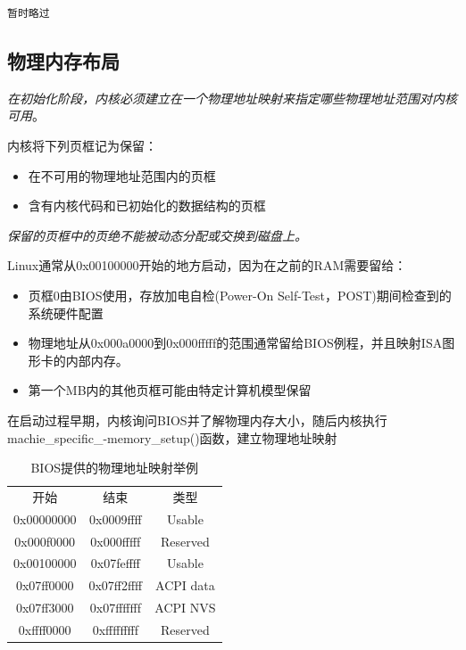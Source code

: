 \begin{lstlisting}[language=C++, caption={对页表项操作的宏}]
暂时略过
\end{lstlisting}

\subsection{物理内存布局}

    \emph{在初始化阶段，内核必须建立在一个物理地址映射来指定哪些物理地址范围对内核可用}。

    内核将下列页框记为保留：

\begin{itemize}
    \item 在不可用的物理地址范围内的页框
    \item 含有内核代码和已初始化的数据结构的页框
\end{itemize}

    \emph{保留的页框中的页绝不能被动态分配或交换到磁盘上。}

    Linux通常从0x00100000开始的地方启动，因为在之前的RAM需要留给：

\begin{itemize}
    \item 页框0由BIOS使用，存放加电自检(Power-On Self-Test，POST)期间检查到的系统硬件配置
    \item 物理地址从0x000a0000到0x000fffff的范围通常留给BIOS例程，并且映射ISA图形卡的内部内存。
    \item 第一个MB内的其他页框可能由特定计算机模型保留
\end{itemize}

    在启动过程早期，内核询问BIOS并了解物理内存大小，随后内核执行machie\_specific\_-memory\_setup()函数，建立物理地址映射

\begin{table}[!htbp]
    \begin{center}
        \caption{BIOS提供的物理地址映射举例}
        \begin{tabular}{c c c}
            \hline
            开始 & 结束 & 类型 \\
            0x00000000 & 0x0009ffff & Usable \\
            0x000f0000 & 0x000fffff & Reserved \\
            0x00100000 & 0x07feffff & Usable \\
            0x07ff0000 & 0x07ff2ffff & ACPI data \\
            0x07ff3000 & 0x07fffffff & ACPI NVS \\
            0xffff0000 & 0xfffffffff & Reserved \\
        \end{tabular}
    \end{center}
\end{table}

